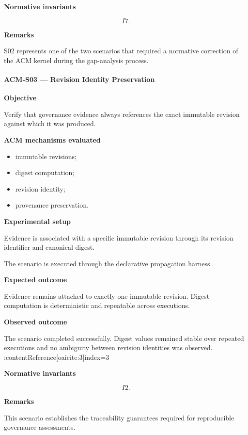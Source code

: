 \documentclass[10pt]{article}
\begin{document}
\textbf{Normative invariants}

\[
I7.
\]

\textbf{Remarks}

S02 represents one of the two scenarios that required a normative correction of
the ACM kernel during the gap-analysis process.

\paragraph{ACM-S03 --- Revision Identity Preservation}

\textbf{Objective}

Verify that governance evidence always references the exact immutable revision
against which it was produced.

\textbf{ACM mechanisms evaluated}

\begin{itemize}
\item immutable revisions;
\item digest computation;
\item revision identity;
\item provenance preservation.
\end{itemize}

\textbf{Experimental setup}

Evidence is associated with a specific immutable revision through its revision
identifier and canonical digest.

The scenario is executed through the declarative propagation harness.

\textbf{Expected outcome}

Evidence remains attached to exactly one immutable revision.
Digest computation is deterministic and repeatable across executions.

\textbf{Observed outcome}

The scenario completed successfully.
Digest values remained stable over repeated executions and no ambiguity between
revision identities was observed. :contentReference[oaicite:3]{index=3}

\textbf{Normative invariants}

\[
I2.
\]

\textbf{Remarks}

This scenario establishes the traceability guarantees required for reproducible
governance assessments.

\end{document}
